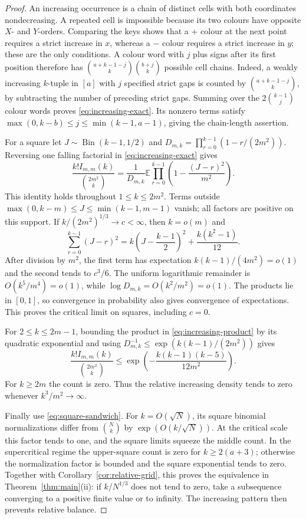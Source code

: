 \documentclass[11pt,letterpaper]{article}
\begin{document}
\begin{proof}
An increasing occurrence is a chain of distinct cells with both coordinates
nondecreasing. A repeated cell is impossible because its two colours have
opposite $X$- and $Y$-orders. Comparing the keys shows that a $+$ colour
at the next point requires a strict increase in $x$, whereas a $-$ colour
requires a strict increase in $y$; these are the only conditions. A colour
word with $j$ plus signs after its first position therefore has
$\binom{a+k-1-j}{k}\binom{b+j}{k}$ possible cell chains. Indeed, a weakly
increasing $k$-tuple in $[a]$ with $j$ specified strict gaps is counted by
$\binom{a+k-1-j}{k}$, by subtracting the number of preceding strict gaps.
Summing over the $2\binom{k-1}{j}$ colour words proves
\eqref{eq:increasing-exact}. Its nonzero terms satisfy
$\max(0,k-b)\le j\le\min(k-1,a-1)$, giving the chain-length assertion.

For a square let $J\sim\operatorname{Bin}(k-1,1/2)$ and
$D_{m,k}=\prod_{r=0}^{k-1}(1-r/(2m^2))$. Reversing one falling factorial in
\eqref{eq:increasing-exact} gives
\begin{equation}\label{eq:increasing-product}
 \frac{k!I_{m,m}(k)}{\binom{2m^2}{k}}
 =\frac1{D_{m,k}}\mathbb E\prod_{r=0}^{k-1}
       \left(1-\frac{(J-r)^2}{m^2}\right).
\end{equation}
This identity holds throughout $1\le k\le2m^2$. Terms outside
$\max(0,k-m)\le J\le\min(k-1,m-1)$ vanish; all factors are positive on this
support. If $k/(2m^2)^{1/3}\to c<\infty$, then $k=o(m)$ and
\[
 \sum_{r=0}^{k-1}(J-r)^2
 =k\left(J-\frac{k-1}{2}\right)^2+\frac{k(k^2-1)}{12}.
\]
After division by $m^2$, the first term has expectation
$k(k-1)/(4m^2)=o(1)$ and the second tends to $c^3/6$.
The uniform logarithmic remainder is $O(k^5/m^4)=o(1)$, while
$\log D_{m,k}=O(k^2/m^2)=o(1)$. The products lie in $[0,1]$, so convergence
in probability also gives convergence of expectations. This proves the
critical limit on squares, including $c=0$.

For $2\le k\le2m-1$, bounding the product in
\eqref{eq:increasing-product} by its quadratic exponential and using
$D_{m,k}^{-1}\le\exp(k(k-1)/(2m^2))$ gives
\[
 \frac{k!I_{m,m}(k)}{\binom{2m^2}{k}}
 \le \exp\left(-\frac{k(k-1)(k-5)}{12m^2}\right).
\]
For $k\ge2m$ the count is zero. Thus the relative increasing density tends
to zero whenever $k^3/m^2\to\infty$.

Finally use \eqref{eq:square-sandwich}. For $k=O(\sqrt N)$, its
square binomial normalizations differ from $\binom Nk$ by
$\exp(O(k/\sqrt N))$. At the critical scale this factor tends to one,
and the square limits squeeze the middle count. In the supercritical
regime the upper-square count is zero for $k\ge2(a+3)$; otherwise the
normalization factor is bounded and the square exponential tends to zero.
Together with Corollary~\ref{cor:relative-grid}, this proves the equivalence
in Theorem~\ref{thm:main}(ii): if $k/N^{1/3}$ does not tend to zero, take
a subsequence converging to a positive finite value or to infinity.
The increasing pattern then prevents relative balance.
\end{proof}
\end{document}
